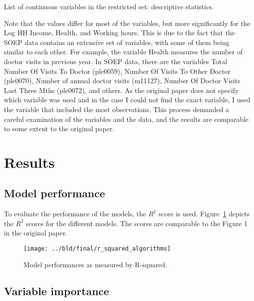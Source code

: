 \documentclass[11pt, a4paper, leqno]{article}
\begin{document}
\begin{table}[htbp]
    \centering
    
    \caption{List of continuous variables in the restricted set: descriptive statistics.}
    \label{tab:descriptive_stats_continuous}
\end{table}


Note that the values differ for most of the variables, but more significantly for the Log HH Income,
Health, and Working hours. This is due to the fact that the SOEP data contains an extensive
set of variables, with some of them being similar to each other. For example, the variable Health
measures the number of doctor visits in previous year. In SOEP data, there are the variables
Total Number Of Visits To Doctor (ple0059), Number Of Visits To Other Doctor (ple0070), Number of
annual doctor visits (m11127), Number Of Doctor Visits Last Three Mths (ple0072), and others.
As the original paper does not specify which variable was used and in the case I could not find
the exact variable, I used the variable that included the most observations. This process
demanded a careful examination of the variables and the data, and the results are comparable
to some extent to the original paper.



\section{Results} %
\label{sec:results}

\subsection{Model performance}

To evaluate the performance of the models, the $R^2$ score is used. Figure~\ref{fig:r_squared_algorithms}
depicts the $R^2$ scores for the different models. The scores are comparable to the Figure 1 in the
original paper.

\begin{figure}[htbp]
    \centering
    \texttt{[image: ../bld/final/r\_squared\_algorithms]}
    \caption{Model performances as measured by R-squared.}
    \label{fig:r_squared_algorithms}
\end{figure}


\subsection{Variable importance}
\end{document}
